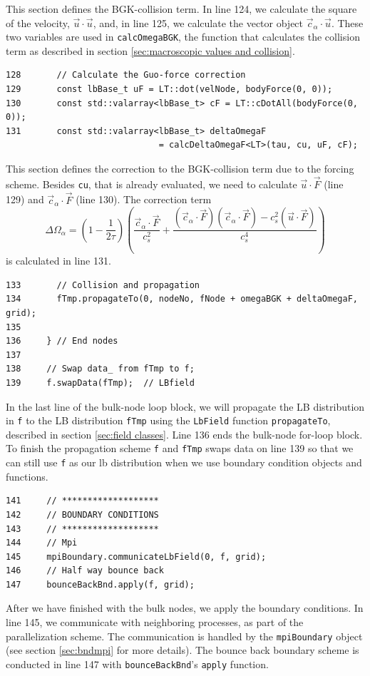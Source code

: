 \documentclass[11pt,a4paper]{report}
\begin{document}
This section defines the BGK-collision term. In line 124, we calculate the square of the velocity, $\vec{u}\cdot\vec{u}$, and, in line 125, we calculate the vector object $\vec{c}_\alpha\cdot\vec{u}$. These two variables are used in \texttt{calcOmegaBGK}, the function that calculates the collision term as described in section \ref{sec:macroscopic values and collision}.   
\begin{verbatim}
128       // Calculate the Guo-force correction
129       const lbBase_t uF = LT::dot(velNode, bodyForce(0, 0));
130       const std::valarray<lbBase_t> cF = LT::cDotAll(bodyForce(0, 0));
131       const std::valarray<lbBase_t> deltaOmegaF 
                              = calcDeltaOmegaF<LT>(tau, cu, uF, cF);
\end{verbatim}
This section defines the correction to the BGK-collision term due to the forcing scheme. Besides \texttt{cu}, that is already evaluated, we need to calculate $\vec{u}\cdot\vec{F}$ (line 129) and $\vec{c}_\alpha\cdot\vec{F}$ (line 130). The correction term
\begin{equation*}
	\Delta\Omega_\alpha = \left(1-\frac{1}{2\tau}\right)\left(\frac{\vec{c}_\alpha\cdot\vec{F}}{c_s^2} + \frac{(\vec{c}_\alpha\cdot\vec{F})(\vec{c}_\alpha\cdot\vec{F}) - c_s^2(\vec{u}\cdot\vec{F})}{c_s^4}\right)
\end{equation*} 
is calculated in line 131.
\begin{verbatim}
133       // Collision and propagation
134       fTmp.propagateTo(0, nodeNo, fNode + omegaBGK + deltaOmegaF, grid);
135
136     } // End nodes
137
138     // Swap data_ from fTmp to f;
139     f.swapData(fTmp);  // LBfield
\end{verbatim}
In the last line of the bulk-node loop block, we will propagate the LB distribution in \texttt{f} to the LB distribution \texttt{fTmp} using the \texttt{LbField} function \texttt{propagateTo}, described in section \ref{sec:field classes}. Line 136 ends the bulk-node for-loop block. To finish the propagation scheme \texttt{f} and \texttt{fTmp} swaps data on line 139 so that we can still use \texttt{f} as our lb distribution when we use boundary condition objects and functions.
\begin{verbatim}
141     // *******************
142     // BOUNDARY CONDITIONS
143     // *******************
144     // Mpi
145     mpiBoundary.communicateLbField(0, f, grid);
146     // Half way bounce back
147     bounceBackBnd.apply(f, grid);
\end{verbatim}
After we have finished with the bulk nodes, we apply the boundary conditions. In line 145, we communicate with neighboring processes, as part of the parallelization scheme. The communication is handled by the \texttt{mpiBoundary} object (see section \ref{sec:bndmpi} for more details). The bounce back boundary scheme is conducted in line 147 with \texttt{bounceBackBnd}'s \texttt{apply} function.
\end{document}
